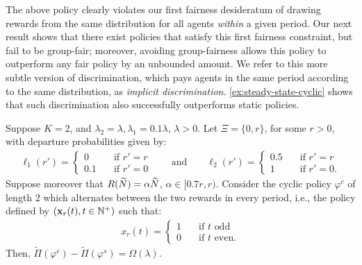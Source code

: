 \documentclass[12pt]{article}
\begin{document}
{The above policy clearly violates our first fairness desideratum of drawing rewards from the same distribution for all agents {\it within} a given period. Our next result shows that there exist policies that satisfy this first fairness constraint, but fail to be group-fair; moreover, avoiding group-fairness allows this policy to outperform any fair policy by an unbounded amount. 
We refer to this more subtle version of discrimination, which pays agents in the same period according to the same distribution, as \emph{implicit  discrimination}.
}
{
\cref{ex:steady-state-cyclic} shows that such discrimination also successfully outperforms static policies.
}



\begin{proposition}\label{ex:steady-state-cyclic}
Suppose $K = 2$, and $\lambda_2 = \lambda, \lambda_1 = {0.1\lambda}$, $\lambda > 0$. Let $\Xi = \{0,r\}$, for some $r > 0$, with departure probabilities given by:
\begin{align*}
    \ell_1(r') = \begin{cases}
    0 \quad &\mbox{if }r' = r \\
    0.1 \quad &\mbox{if }r' = 0
    \end{cases} \qquad \text{and} \qquad 
    \ell_2(r') = \begin{cases}
    0.5 \quad &\mbox{if }r' = r \\
    1 \quad &\mbox{if }r' = 0.
    \end{cases}
\end{align*}
Suppose moreover that $R(\widetilde{N}) = \alpha \widetilde{N}$, $\alpha \in [0.7r, r)$. Consider the cyclic policy $\varphi^c$ of length $2$ which alternates between the two rewards in every period, i.e., the policy defined by $(\mathbf{x}_r(t), t \in \mathbb{N}^+)$ such that:
\begin{align*}
    x_r(t) = \begin{cases}
    1 \quad &\mbox{if } t \text{ odd} \\
    0 \quad &\mbox{if } t \text{ even}.
    \end{cases}
\end{align*}
Then, $\widetilde{\Pi}(\varphi^c) -\widetilde{\Pi}(\varphi^s) = \Omega(\lambda).$
\end{proposition}
\end{document}
